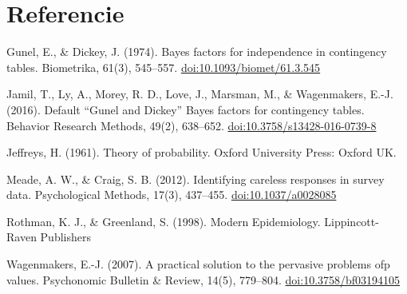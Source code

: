 \documentclass[
]{article}
\begin{document}
\newpage

\hypertarget{referencie}{%
\section{Referencie}\label{referencie}}

Gunel, E., \& Dickey, J. (1974). Bayes factors for independence in contingency tables. Biometrika, 61(3), 545--557. \url{doi:10.1093/biomet/61.3.545}

Jamil, T., Ly, A., Morey, R. D., Love, J., Marsman, M., \& Wagenmakers, E.-J. (2016). Default ``Gunel and Dickey'' Bayes factors for contingency tables. Behavior Research Methods, 49(2), 638--652. \url{doi:10.3758/s13428-016-0739-8}

Jeffreys, H. (1961). Theory of probability. Oxford University Press: Oxford UK.

Meade, A. W., \& Craig, S. B. (2012). Identifying careless responses in survey data. Psychological Methods, 17(3), 437--455. \url{doi:10.1037/a0028085}

Rothman, K. J., \& Greenland, S. (1998). Modern Epidemiology. Lippincott-Raven Publishers

Wagenmakers, E.-J. (2007). A practical solution to the pervasive problems ofp values. Psychonomic Bulletin \& Review, 14(5), 779--804. \url{doi:10.3758/bf03194105}
\end{document}
